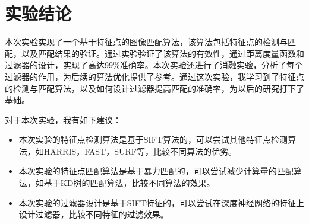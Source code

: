 \section{实验结论}

本次实验实现了一个基于特征点的图像匹配算法，该算法包括特征点的检测与匹配，以及匹配结果的验证。通过实验验证了该算法的有效性，通过距离度量函数和过滤器的设计，实现了高达99\%准确率。本次实验还进行了消融实验，分析了每个过滤器的作用，为后续的算法优化提供了参考。通过这次实验，我学习到了特征点的检测与匹配算法，以及如何设计过滤器提高匹配的准确率，为以后的研究打下了基础。

对于本次实验，我有如下建议：

\begin{itemize}
    \item 本次实验的特征点检测算法是基于SIFT算法的，可以尝试其他特征点检测算法，如HARRIS，FAST，SURF等，比较不同算法的优劣。
    \item 本次实验的特征点匹配算法是基于暴力匹配的，可以尝试减少计算量的匹配算法，如基于KD树的匹配算法，比较不同算法的效果。
    \item 本次实验的过滤器设计是基于SIFT特征的，可以尝试在深度神经网络的特征上设计过滤器，比较不同特征的过滤效果。
\end{itemize}
